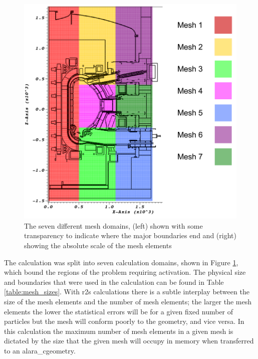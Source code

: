 \documentclass[12pt]{article}
\begin{document}
\begin{figure}[ht!]
  \centering
  \includegraphics[scale=0.4]{../plots/transport/job_splits.png}
  \caption{The seven different mesh domains, (left) shown with some transparency
           to indicate where the major boundaries end and (right) showing the
           absolute scale of the mesh elements}
  \label{fig:mesh_domains}
\end{figure}

The calculation was split into seven calculation domains, shown in Figure
\ref{fig:mesh_domains}, which bound the regions of the problem requiring
activation. The physical size and boundaries that were used in the calculation
can be found in Table \ref{table:mesh_sizes}. With \gls{r2s} calculations there 
is a subtle interplay between the size of the mesh elements and the number of mesh
elements; the larger the mesh elements the lower the statistical errors will be
for a given fixed number of particles but the mesh will conform poorly to the
geometry, and vice versa. In this calculation the maximum number of mesh
elements in a given mesh is dictated by the size that the given mesh will
occupy in memory when transferred to an \gls{alara_c}geometry. 
\end{document}
